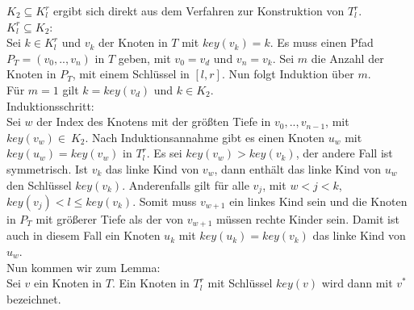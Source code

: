 \documentclass[a4paper,12pt]{article}
\begin{document}
\noindent $K_2 \subseteq  K^r_l$ ergibt sich direkt aus dem Verfahren zur Konstruktion von $T^r_l$.\\

\noindent $ K^r_l \subseteq K_2$:\\
Sei $k \in K^r_l$ und $v_k$ der Knoten in $T$ mit $\mathit{key}(v_k) = k$. Es muss einen Pfad $P_T = \left(v_0,..,v_n\right)$ in $T$ geben, mit $v_0 = v_d$ und $v_n = v_k$. Sei $m$ die Anzahl der Knoten in $P_T$, mit einem Schlüssel in  $\left[l,r\right]$. Nun folgt Induktion über $m$.\\
Für $m = 1$ gilt $k = \mathit{key}\left(v_d\right)$  und $k \in K_2$. \\
Induktionsschritt:\\
Sei $w$ der Index des Knotens mit der größten Tiefe in $ v_0,..,v_{n-1}$, mit $\mathit{key}(v_w) \in~K_2$. Nach Induktionsannahme gibt es einen Knoten $u_w$ mit $\mathit{key}(u_w) = \mathit{key}(v_w)$ in $T^r_l$.  Es sei $\mathit{key}(v_w) > \mathit{key}(v_k)$, der andere Fall ist symmetrisch. Ist $v_k$ das linke Kind von $v_w$, dann enthält das linke Kind von $u_w$ den Schlüssel $\mathit{key}(v_k)$. Anderenfalls gilt für alle $v_j$, mit $w < j < k$, $\mathit{key}(v_j) < l \leq \mathit{key}(v_k)$. Somit muss $v_{w+1}$ ein linkes Kind sein und die Knoten in $P_T$ mit größerer Tiefe als der von $v_{w+1}$ müssen rechte Kinder sein. Damit ist auch in diesem Fall ein Knoten $u_k$ mit $\mathit{key}(u_k) = \mathit{key}(v_k)$ das linke Kind von $u_w$.  \\

\noindent Nun kommen wir zum Lemma:\\






\noindent Sei $v$ ein Knoten in $T$. Ein Knoten in $T^r_l$ mit Schlüssel $\mathit{key}(v)$ wird dann mit $v^*$ bezeichnet.  
\end{document}

